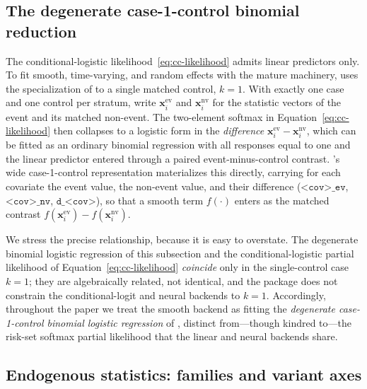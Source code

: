 \subsection{The degenerate case-1-control binomial reduction}
\label{sec:degenerate}

The conditional-logistic likelihood~\eqref{eq:cc-likelihood} admits
linear predictors only. To fit smooth, time-varying, and random effects
with the mature  machinery,  uses the specialization
of \citet{boschi2025gof, boschi2025rhem} to a single matched control,
$k = 1$. With exactly one case and one control per stratum, write
$\mathbf{x}^{\mathrm{ev}}_i$ and $\mathbf{x}^{\mathrm{nv}}_i$ for the
statistic vectors of the event and its matched non-event. The two-element
softmax in Equation~\eqref{eq:cc-likelihood} then collapses to a logistic
form in the \emph{difference} $\mathbf{x}^{\mathrm{ev}}_i -
\mathbf{x}^{\mathrm{nv}}_i$, which can be fitted as an ordinary binomial
regression with all responses equal to one and the linear predictor
entered through a paired event-minus-control contrast. 's wide
case-1-control representation materializes this directly, carrying for
each covariate the event value, the non-event value, and their difference
($\texttt{<cov>\_ev}$, $\texttt{<cov>\_nv}$, $\texttt{d\_<cov>}$), so that
a smooth term $f(\cdot)$ enters  as the matched contrast
$f(\mathbf{x}^{\mathrm{ev}}_i) - f(\mathbf{x}^{\mathrm{nv}}_i)$.

We stress the precise relationship, because it is easy to overstate. The
degenerate binomial logistic regression of this subsection and the
conditional-logistic partial likelihood of
Equation~\eqref{eq:cc-likelihood} \emph{coincide} only in the single-control
case $k = 1$; they are algebraically related, not identical, and the
package does not constrain the conditional-logit and neural backends to
$k = 1$. Accordingly, throughout the paper we treat the smooth backend as
fitting the \emph{degenerate case-1-control binomial logistic regression}
of \citet{boschi2025gof}, distinct from---though kindred to---the risk-set
softmax partial likelihood that the linear and neural backends share.

\subsection{Endogenous statistics: families and variant axes}
\label{sec:statistics}

